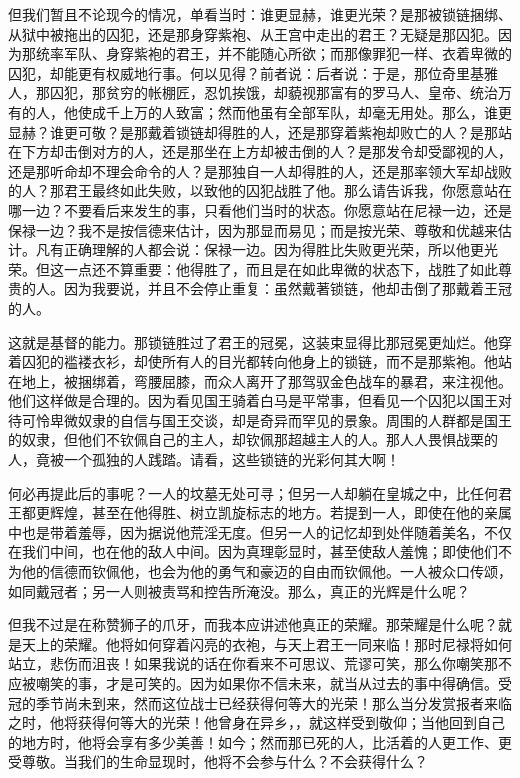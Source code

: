 但我们暂且不论现今的情况，单看当时：谁更显赫，谁更光荣？是那被锁链捆绑、从狱中被拖出的囚犯，还是那身穿紫袍、从王宫中走出的君王？无疑是那囚犯。因为那统率军队、身穿紫袍的君王，并不能随心所欲；而那像罪犯一样、衣着卑微的囚犯，却能更有权威地行事。何以见得？前者说：后者说：于是，那位奇里基雅人，那囚犯，那贫穷的帐棚匠，忍饥挨饿，却藐视那富有的罗马人、皇帝、统治万有的人，他使成千上万的人致富；然而他虽有全部军队，却毫无用处。那么，谁更显赫？谁更可敬？是那戴着锁链却得胜的人，还是那穿着紫袍却败亡的人？是那站在下方却击倒对方的人，还是那坐在上方却被击倒的人？是那发令却受鄙视的人，还是那听命却不理会命令的人？是那独自一人却得胜的人，还是那率领大军却战败的人？那君王最终如此失败，以致他的囚犯战胜了他。那么请告诉我，你愿意站在哪一边？不要看后来发生的事，只看他们当时的状态。你愿意站在尼禄一边，还是保禄一边？我不是按信德来估计，因为那显而易见；而是按光荣、尊敬和优越来估计。凡有正确理解的人都会说：保禄一边。因为得胜比失败更光荣，所以他更光荣。但这一点还不算重要：他得胜了，而且是在如此卑微的状态下，战胜了如此尊贵的人。因为我要说，并且不会停止重复：虽然戴著锁链，他却击倒了那戴着王冠的人。\par

这就是基督的能力。那锁链胜过了君王的冠冕，这装束显得比那冠冕更灿烂。他穿着囚犯的褴褛衣衫，却使所有人的目光都转向他身上的锁链，而不是那紫袍。他站在地上，被捆绑着，弯腰屈膝，而众人离开了那驾驭金色战车的暴君，来注视他。他们这样做是合理的。因为看见国王骑着白马是平常事，但看见一个囚犯以国王对待可怜卑微奴隶的自信与国王交谈，却是奇异而罕见的景象。周围的人群都是国王的奴隶，但他们不钦佩自己的主人，却钦佩那超越主人的人。那人人畏惧战栗的人，竟被一个孤独的人践踏。请看，这些锁链的光彩何其大啊！\par

何必再提此后的事呢？一人的坟墓无处可寻；但另一人却躺在皇城之中，比任何君王都更辉煌，甚至在他得胜、树立凯旋标志的地方。若提到一人，即使在他的亲属中也是带着羞辱，因为据说他荒淫无度。但另一人的记忆却到处伴随着美名，不仅在我们中间，也在他的敌人中间。因为真理彰显时，甚至使敌人羞愧；即使他们不为他的信德而钦佩他，也会为他的勇气和豪迈的自由而钦佩他。一人被众口传颂，如同戴冠者；另一人则被责骂和控告所淹没。那么，真正的光辉是什么呢？\par

但我不过是在称赞狮子的爪牙，而我本应讲述他真正的荣耀。那荣耀是什么呢？就是天上的荣耀。他将如何穿着闪亮的衣袍，与天上君王一同来临！那时尼禄将如何站立，悲伤而沮丧！如果我说的话在你看来不可思议、荒谬可笑，那么你嘲笑那不应被嘲笑的事，才是可笑的。因为如果你不信未来，就当从过去的事中得确信。受冠的季节尚未到来，然而这位战士已经获得何等大的光荣！那么当分发赏报者来临之时，他将获得何等大的光荣！他曾身在异乡，，就这样受到敬仰；当他回到自己的地方时，他将会享有多少美善！如今；然而那已死的人，比活着的人更工作、更受尊敬。当我们的生命显现时，他将不会参与什么？不会获得什么？\par


